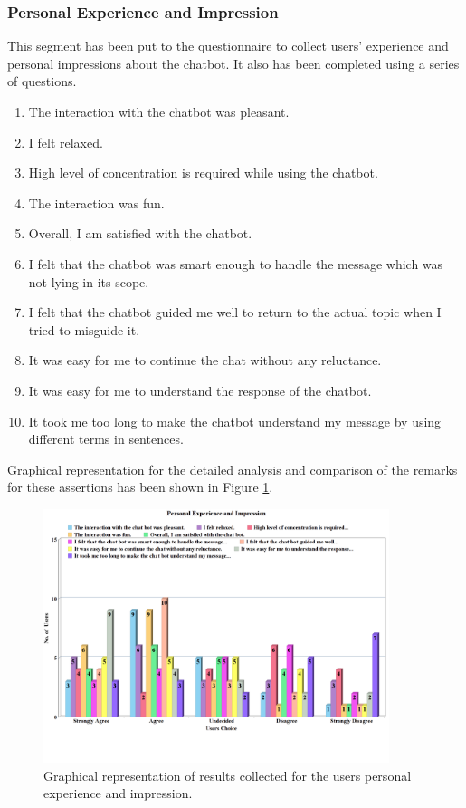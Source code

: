 \subsubsection*{Personal Experience and Impression}
This segment has been put to the questionnaire to collect users' experience and personal impressions about the chatbot. It also has been completed using a series of questions. 
\begin{enumerate}
    \item The interaction with the chatbot was pleasant.
    \item I felt relaxed.
    \item High level of concentration is required while using the chatbot.
    \item The interaction was fun.
    \item Overall, I am satisfied with the chatbot.
    \item I felt that the chatbot was smart enough to handle the message which was not lying in its scope.
    \item I felt that the chatbot guided me well to return to the actual topic when I tried to misguide it.
    \item It was easy for me to continue the chat without any reluctance.
    \item It was easy for me to understand the response of the chatbot.
    \item It took me too long to make the chatbot understand my message by using different terms in sentences.
\end{enumerate}
Graphical representation for the detailed analysis and comparison of the remarks for these assertions has been shown in Figure \ref{fig:persExpandImp}.

\begin{figure}[!h]
    \centering
    \includegraphics[width=0.9\textwidth]{img/Personal_Experience_and_Impression_Updated_2.png}
    \caption{Graphical representation of results collected for the users personal experience and impression.}
    \label{fig:persExpandImp}
\end{figure}

